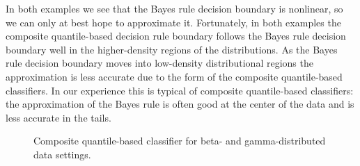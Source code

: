 In both examples we see that the Bayes rule decision boundary is nonlinear, so
we can only at best hope to approximate it.  Fortunately, in both examples the
composite quantile-based decision rule boundary follows the Bayes rule decision
boundary well in the higher-density regions of the distributions.  As the Bayes
rule decision boundary moves into low-density distributional regions the
approximation is less accurate due to the form of the composite quantile-based
classifiers.  In our experience this is typical of composite quantile-based
classifiers: the approximation of the Bayes rule is often good at the center of
the data and is less accurate in the tails.

\begin{figure}[ht]
  \caption{Composite quantile-based classifier for beta- and gamma-distributed
    data settings.}
  \label{fig:beta-and-gamma}
  \centering
  \vspace{5mm}


\end{figure}
